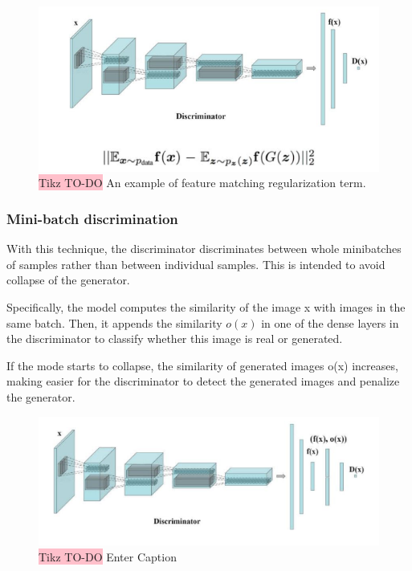 \begin{figure}[!htbp]
    \centering
    \includegraphics[width=\linewidth]{tikz/feature matching.png}
    \caption{{\color{red}\colorbox{pink}{Tikz TO-DO}} An example of feature matching regularization term.}
    \label{fig:feature-matching}
\end{figure}


 

\subsubsection{Mini-batch discrimination}

With this technique, the discriminator discriminates between whole minibatches of samples rather than between individual samples. This is intended to avoid collapse of the generator.


Specifically, the model computes the similarity of the image x with images in the same batch. Then, it appends the similarity $o(x)$ in one of the dense layers in the discriminator to classify whether this image is real or generated.

If the mode starts to collapse, the similarity of generated images o(x)
increases, making easier for the discriminator to detect the generated images
and penalize the generator.


\begin{figure}[!htbp]
    \centering
    \includegraphics[width=\linewidth]{tikz/Minibatch discrimination.png}
    \caption{{\color{red}\colorbox{pink}{Tikz TO-DO}} Enter Caption}
    \label{fig:mini-batch-discrimination}
\end{figure}

